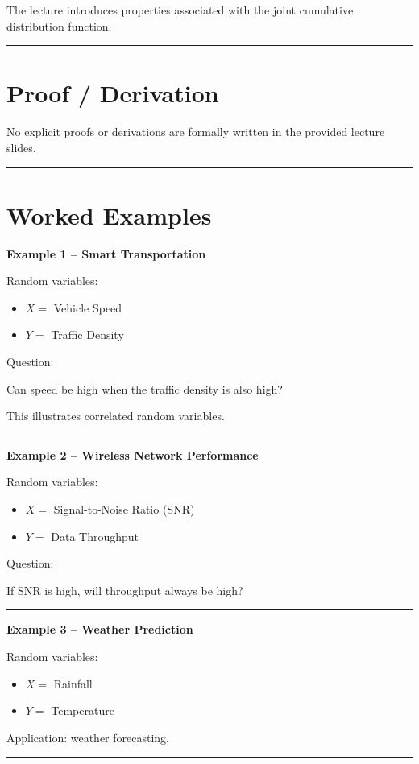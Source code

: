 \documentclass[12pt]{article}
\begin{document}
The lecture introduces properties associated with the joint cumulative distribution function.\\
\noindent\rule{\linewidth}{0.4pt}
\section{Proof / Derivation}

No explicit proofs or derivations are formally written in the provided lecture slides.\\
\noindent\rule{\linewidth}{0.4pt}
\section{Worked Examples}

\textbf{Example 1 -- Smart Transportation}

Random variables:

\begin{itemize}
\item $X =$ Vehicle Speed
\item $Y =$ Traffic Density
\end{itemize}

Question:

Can speed be high when the traffic density is also high?

This illustrates correlated random variables.\\
\noindent\rule{\linewidth}{0.4pt}
\textbf{Example 2 -- Wireless Network Performance}

Random variables:

\begin{itemize}
\item $X =$ Signal-to-Noise Ratio (SNR)
\item $Y =$ Data Throughput
\end{itemize}

Question:

If SNR is high, will throughput always be high?\\
\noindent\rule{\linewidth}{0.4pt}
\newpage
\textbf{Example 3 -- Weather Prediction}

Random variables:

\begin{itemize}
\item $X =$ Rainfall
\item $Y =$ Temperature
\end{itemize}

Application: weather forecasting.\\
\noindent\rule{\linewidth}{0.4pt}
\end{document}
